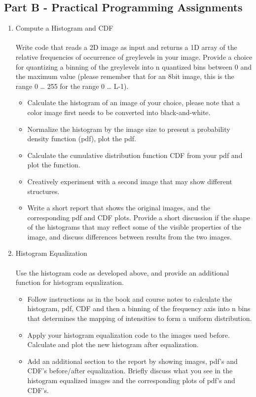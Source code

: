 \documentclass{article}
\begin{document}
\subsection{Part B - Practical Programming Assignments}
\begin{enumerate}[label=B\arabic*)]
	\item Compute a Histogram and CDF 
		\\
		\\
		Write code that reads a 2D image as input and returns a 1D array of the relative frequencies of occurrence of greylevels in your image. Provide a choice for quantizing a binning of the greylevels into n quantized bins between 0 and the maximum value (please remember that for an 8bit image, this is the range 0 … 255 for the range 0 … L-1).
		\begin{itemize}
			\item Calculate the histogram of an image of your choice, please note that a color image first needs to be converted into black-and-white.
			\item Normalize the histogram by the image size to present a probability density function (pdf), plot the pdf.
			\item Calculate the cumulative distribution function CDF from your pdf and plot the function.
			\item Creatively experiment with a second image that may show different structures.
			\item Write a short report that shows the original images, and the corresponding pdf and CDF plots. Provide a short discussion if the shape of the histograms that may reflect some of the visible properties of the image, and discuss differences between results from the two images.
		\end{itemize}

		
	\item Histogram Equalization 
		\\
		\\
		Use the histogram code as developed above, and provide an additional function for histogram equalization.
		\begin{itemize}
			\item Follow instructions as in the book and course notes to calculate the histogram, pdf, CDF and then a binning of the frequency axis into n bins that determines the mapping of intensities to form a uniform distribution.
			\item Apply your histogram equalization code to the images used before. Calculate and plot the new histogram after equalization.
			\item Add an additional section to the report by showing images, pdf’s and CDF’s before/after equalization. Briefly discuss what you see in the histogram equalized images and the corresponding plots of pdf’s and CDF’s.
		\end{itemize}
		

\end{enumerate}
\end{document}
